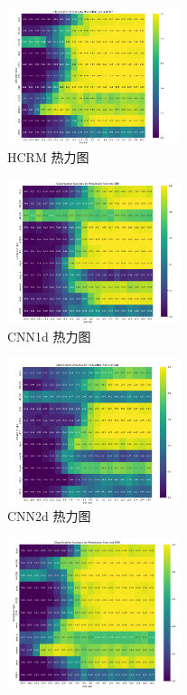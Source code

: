 \documentclass{article}
\begin{document}
\begin{CJK}{UTF8}{gbsn}
\begin{figure}[H]
    \centering
    \includegraphics[width=0.45\textwidth]{figure/image11.png}
    \caption{HCRM 热力图}
    \label{fig:traditional_model_heatmap_hcrm}
\end{figure}
\begin{figure}[H]
    \centering
    \includegraphics[width=0.45\textwidth]{figure/image15.png}
    \caption{CNN1d 热力图}
    \label{fig:traditional_model_heatmap_cnn1d}
\end{figure}
\begin{figure}[H]
    \centering
    \includegraphics[width=0.45\textwidth]{figure/image16.png}
    \caption{CNN2d 热力图}
    \label{fig:traditional_model_heatmap_cnn2d}
\end{figure}
\begin{figure}[H]
    \centering
    \includegraphics[width=0.45\textwidth]{figure/image17.png}

\end{figure}
\end{CJK}
\end{document}
